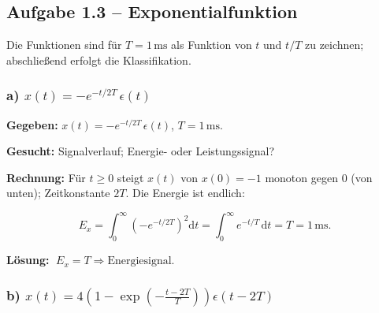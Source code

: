 \subsection*{Aufgabe 1.3 – Exponentialfunktion}

Die Funktionen sind für $T = 1\,\mathrm{ms}$ als Funktion von $t$ und $t/T$ zu
zeichnen; abschließend erfolgt die Klassifikation.

\subsubsection*{a) $x(t) = -e^{-t/2T}\,\epsilon(t)$}

\begin{beispiel}

\textbf{Gegeben:} $x(t) = -e^{-t/2T}\,\epsilon(t)$, $T = 1\,\mathrm{ms}$.

\textbf{Gesucht:} Signalverlauf; Energie- oder Leistungssignal?

\textbf{Rechnung:} Für $t \geq 0$ steigt $x(t)$ von $x(0) = -1$ monoton gegen
$0$ (von unten); Zeitkonstante $2T$. Die Energie ist endlich:

$$
E_x = \int_0^{\infty} \left(-e^{-t/2T}\right)^2 \mathrm{d}t
    = \int_0^{\infty} e^{-t/T}\,\mathrm{d}t = T = 1\,\mathrm{ms}.
$$

\begin{center}
\end{center}

\textbf{Lösung:} $\boxed{\;E_x = T \Rightarrow \text{Energiesignal.}\;}$

\end{beispiel}

\subsubsection*{b) $x(t) = 4\left(1 - \exp\!\left(-\frac{t-2T}{T}\right)\right)\epsilon(t-2T)$}

